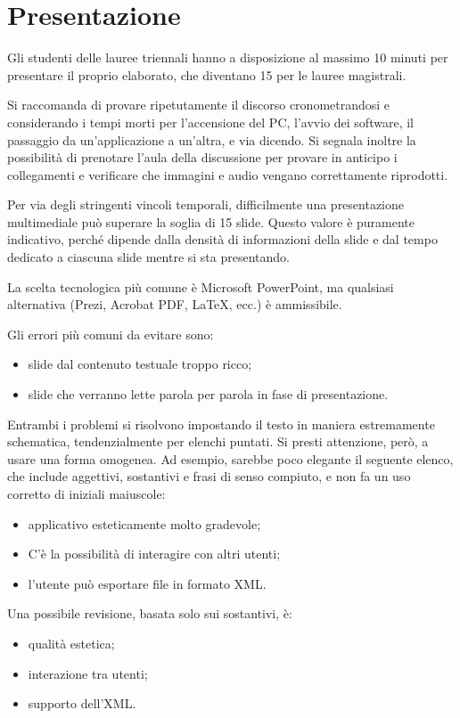 \documentclass[12pt]{report}
\begin{document}
    \section{Presentazione}
    Gli studenti delle lauree triennali hanno a disposizione al massimo 10 minuti per presentare il proprio elaborato, che diventano 15 per le lauree magistrali.

    Si raccomanda di provare ripetutamente il discorso cronometrandosi e considerando i tempi morti per l'accensione del PC, l'avvio dei software, il passaggio da un'applicazione a un'altra, e via dicendo. Si segnala inoltre la possibilità di prenotare l'aula della discussione per provare in anticipo i collegamenti e verificare che immagini e audio vengano correttamente riprodotti.

    Per via degli stringenti vincoli temporali, difficilmente una presentazione multimediale può superare la soglia di 15 slide. Questo valore è puramente indicativo, perché dipende dalla densità di informazioni della slide e dal tempo dedicato a ciascuna slide mentre si sta presentando.

    La scelta tecnologica più comune è Microsoft PowerPoint, ma qualsiasi alternativa (Prezi, Acrobat PDF, \LaTeX, ecc.) è ammissibile.

    Gli errori più comuni da evitare sono:
    \begin{itemize}
        \item slide dal contenuto testuale troppo ricco;
        \item slide che verranno lette parola per parola in fase di presentazione.
    \end{itemize}

    Entrambi i problemi si risolvono impostando il testo in maniera estremamente schematica, tendenzialmente per elenchi puntati. Si presti attenzione, però, a usare una forma omogenea.
    Ad esempio, sarebbe poco elegante il seguente elenco, che include aggettivi, sostantivi e frasi di senso compiuto, e non fa un uso corretto di iniziali maiuscole:
    \begin{itemize}
        \item applicativo esteticamente molto gradevole;
        \item C'è la possibilità di interagire con altri utenti;
        \item l'utente può esportare file in formato XML.
    \end{itemize}

    Una possibile revisione, basata solo sui sostantivi, è:
    \begin{itemize}
        \item qualità estetica;
        \item interazione tra utenti;
        \item supporto dell'XML.
    \end{itemize}
\end{document}
